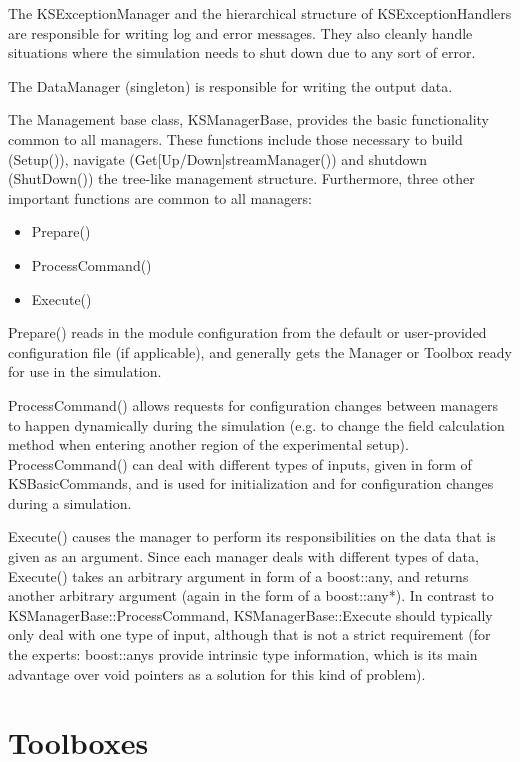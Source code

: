 The KSExceptionManager and the hierarchical structure of KSExceptionHandlers are responsible for writing log and error messages. They also cleanly handle situations where the simulation needs to shut down due to any sort of error.
 
The DataManager (singleton) is responsible for writing the output data.
 
The Management base class, KSManagerBase, provides the basic functionality common to all managers. These functions include those necessary to build (Setup()), navigate  (Get[Up/Down]streamManager()) and shutdown (ShutDown()) the tree-like management structure.  Furthermore, three other important functions are common to all managers:
\begin{itemize}
 \item Prepare()
 \item ProcessCommand()
 \item Execute()
\end{itemize}
 
Prepare() reads in the module configuration from the default or user-provided configuration file (if applicable), and generally gets the Manager or Toolbox ready for use in the simulation.
 
ProcessCommand() allows requests for configuration changes between managers to happen dynamically during the simulation (e.g. to change the field calculation method when entering another region of the experimental setup).  ProcessCommand() can deal with different types of inputs, given in form of KSBasicCommands, and is used for initialization and for configuration changes during a simulation.
 
Execute() causes the manager to perform its responsibilities on the data that is given as an argument.  Since each manager deals with different types of data, Execute() takes an arbitrary argument in form of a boost::any, and returns another arbitrary argument (again in the form of a boost::any*).  In contrast to KSManagerBase::ProcessCommand, KSManagerBase::Execute should typically only deal with one type of input, although that is not a strict requirement (for the experts: boost::anys provide intrinsic type information, which is its main advantage over void pointers as a solution for this kind of problem).
 
\section{Toolboxes}

